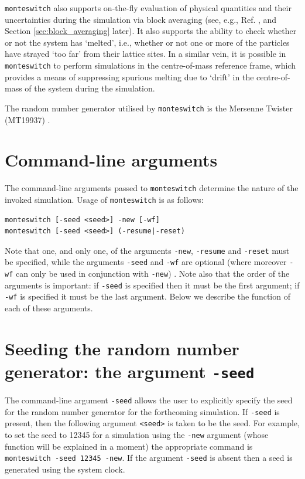 \documentclass{report}
\begin{document}
\texttt{monteswitch} also supports on-the-fly evaluation of physical quantities and their uncertainties during the simulation via block 
averaging (see, e.g., Ref. \cite{book:Frenkel}, and Section \ref{sec:block_averaging} later). It also supports the ability to check whether or not 
the system has `melted', i.e., whether or not one or more of the particles have strayed `too far' from their lattice sites. In a similar vein, 
it is possible in \texttt{monteswitch} to perform simulations in the centre-of-mass reference frame, which provides a means of suppressing spurious
melting due to `drift' in the centre-of-mass of the system during the simulation.

The random number generator utilised by \texttt{monteswitch} is the Mersenne Twister (MT19937) \cite{Matsumoto_1998}.


\section{Command-line arguments}
The command-line arguments passed to \texttt{monteswitch} determine the nature of the invoked simulation. Usage of \texttt{monteswitch} is as follows: 
\begin{verbatim}
monteswitch [-seed <seed>] -new [-wf]
monteswitch [-seed <seed>] (-resume|-reset)
\end{verbatim}
Note that one, and only one, of the arguments \texttt{-new}, \texttt{-resume} and \texttt{-reset} must be specified,
while the arguments \texttt{-seed} and \texttt{-wf} are optional (where moreover \texttt{-wf} can only be used in conjunction with \texttt{-new}) . 
Note also that the order of the arguments is important: if \texttt{-seed} is specified then it must be the first argument; if
\texttt{-wf} is specified it must be the last argument. Below we describe the function of each of these arguments.


\section{Seeding the random number generator: the argument \texttt{-seed}}
The command-line argument \texttt{-seed} allows the user to explicitly specify the seed for the random number generator for the forthcoming simulation. 
If \texttt{-seed} is present, then the following argument \texttt{<seed>}
is taken to be the seed. For example, to set the seed to 12345 for a simulation using the \texttt{-new}
argument (whose function will be explained in a moment) the appropriate command is \texttt{monteswitch -seed 12345 -new}.
If the argument \texttt{-seed} is absent then a seed is generated using the system clock.
\end{document}
